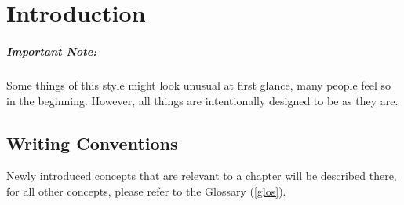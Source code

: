\chapter{Introduction}\label{ch:introduction}

\paragraph{Important Note:} Some things of this style might look
unusual at first glance, many people feel so in the beginning.
However, all things are intentionally designed to be as they are.



\section{Writing Conventions}
Newly introduced concepts that are relevant to a chapter will be described there, for all other concepts, please refer to the Glossary (\autoref{glos}).










   

